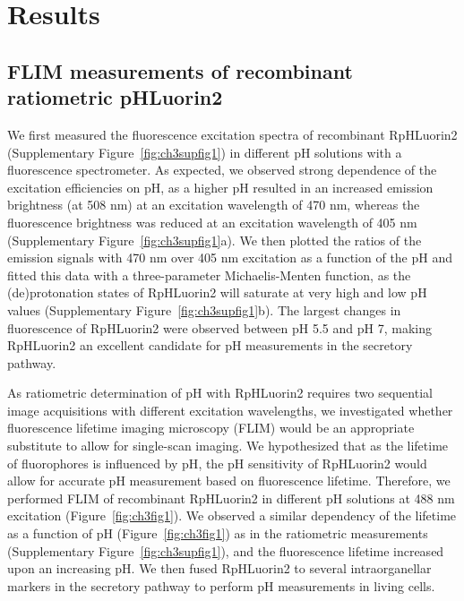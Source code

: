 \section{Results}

\subsection{FLIM measurements of recombinant ratiometric pHLuorin2}

We first measured the fluorescence excitation spectra of recombinant RpHLuorin2 (Supplementary Figure~\ref{fig:ch3supfig1}) in different pH solutions with a fluorescence spectrometer. As expected\cite{miesenbock_visualizing_1998}, we observed strong dependence of the excitation efficiencies on pH, as a higher pH resulted in an increased emission brightness (at 508 nm) at an excitation wavelength of 470 nm, whereas the fluorescence brightness was reduced at an excitation wavelength of 405 nm (Supplementary Figure~\ref{fig:ch3supfig1}a). We then plotted the ratios of the emission signals with 470 nm over 405 nm excitation as a function of the pH and fitted this data with a three-parameter Michaelis-Menten function, as the (de)protonation states of RpHLuorin2 will saturate at very high and low pH values (Supplementary Figure~\ref{fig:ch3supfig1}b). The largest changes in fluorescence of RpHLuorin2 were observed between pH 5.5 and pH 7, making RpHLuorin2 an excellent candidate for pH measurements in the secretory pathway.

As ratiometric determination of pH with RpHLuorin2 requires two sequential image acquisitions with different excitation wavelengths, we investigated whether fluorescence lifetime imaging microscopy (FLIM) would be an appropriate substitute to allow for single-scan imaging. We hypothesized that as the lifetime of fluorophores is influenced by pH\cite{schmitt_egfp-phsens_2014,lin_fluorescence_2003}, the pH sensitivity of RpHLuorin2 would allow for accurate pH measurement based on fluorescence lifetime. Therefore, we performed FLIM of recombinant RpHLuorin2 in different pH solutions at 488 nm excitation (Figure~\ref{fig:ch3fig1}).  We observed a similar dependency of the lifetime as a function of pH (Figure~\ref{fig:ch3fig1}) as in the ratiometric measurements (Supplementary Figure~\ref{fig:ch3supfig1}), and the fluorescence lifetime increased upon an increasing pH. We then fused RpHLuorin2 to several intraorganellar markers in the secretory pathway to perform pH measurements in living cells.

